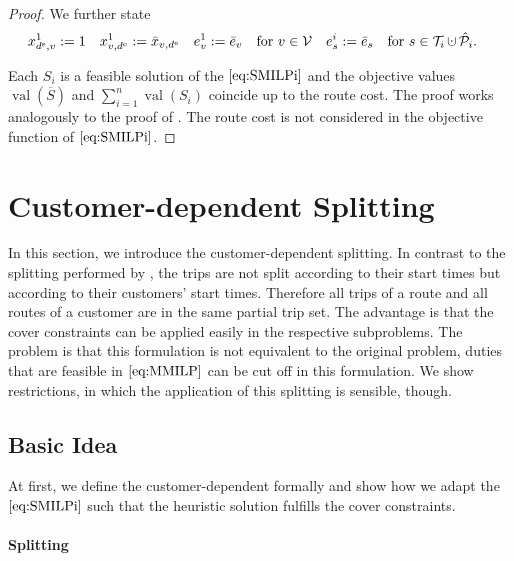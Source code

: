 \begin{proof}
We further state
\begin{align*}
	x^1_{\ds,v} := 1 && x^1_{v,\de} := \bar{x}_{v,\de} && e^1_v := \bar{e}_v && \text{for } v\in\mathcal{V} && e^i_s & := \bar{e}_s && \text{for } s\in\Ti\cupdot\Phat_i.
\end{align*}

Each $S_i$ is a feasible solution of the $\eqref{eq:SMILPi}$ and the objective values $\operatorname{val}(\overline{S})$ and ${\sum_{i=1}^n\operatorname{val}\left(S_i\right)}$ coincide up to the route cost. The proof works analogously to the proof of . The route cost is not considered in the objective function of $\eqref{eq:SMILPi}$.
%
\end{proof}


\section{Customer-dependent Splitting}
\label{sec:customer_dependent_splitting}

In this section, we introduce the customer-dependent splitting. In contrast to the splitting performed by \cite{Knoll}, the trips are not split according to their start times but according to their customers' start times. Therefore all trips of a route and all routes of a customer are in the same partial trip set. The advantage is that the cover constraints can be applied easily in the respective subproblems. The problem is that this formulation is not equivalent to the original problem, \ie duties that are feasible in $\eqref{eq:MMILP}$ can be cut off in this formulation. We show restrictions, in which the application of this splitting is sensible, though. 

\subsection{Basic Idea}

At first, we define the customer-dependent formally and show how we adapt the $\eqref{eq:SMILPi}$ such that the heuristic solution fulfills the cover constraints.

\paragraph{Splitting} \parfill

